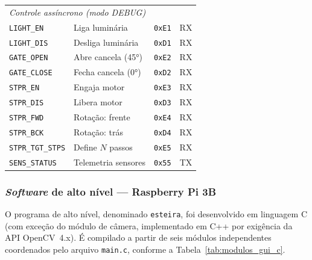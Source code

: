 \begin{table}[!htpb]
\begin{tabular}{p{2.2cm}p{2.9cm}cc}
\hline
\multicolumn{4}{l}{\textit{Controle assíncrono (modo DEBUG)}} \\
\texttt{LIGHT\_EN}        & Liga luminária               & \texttt{0xE1} & RX \\
\texttt{LIGHT\_DIS}       & Desliga luminária            & \texttt{0xD1} & RX \\
\texttt{GATE\_OPEN}       & Abre cancela (45°)           & \texttt{0xE2} & RX \\
\texttt{GATE\_CLOSE}      & Fecha cancela (0°)           & \texttt{0xD2} & RX \\
\texttt{STPR\_EN}         & Engaja motor                 & \texttt{0xE3} & RX \\
\texttt{STPR\_DIS}        & Libera motor                 & \texttt{0xD3} & RX \\
\texttt{STPR\_FWD}        & Rotação: frente              & \texttt{0xE4} & RX \\
\texttt{STPR\_BCK}        & Rotação: trás                & \texttt{0xD4} & RX \\
\texttt{STPR\_TGT\_STPS}  & Define $N$ passos            & \texttt{0xE5} & RX \\
\texttt{SENS\_STATUS}     & Telemetria sensores          & \texttt{0x55} & TX \\
\hline
\end{tabular}
\end{table}

\subsubsection{\textit{Software} de alto nível — Raspberry Pi 3B}

O programa de alto nível, denominado \texttt{esteira}, foi desenvolvido em
linguagem C (com exceção do módulo de câmera, implementado em C++ por
exigência da API OpenCV~4.x). É compilado a partir de seis módulos
independentes coordenados pelo arquivo \texttt{main.c}, conforme
a Tabela~\ref{tab:modulos_gui_c}.

